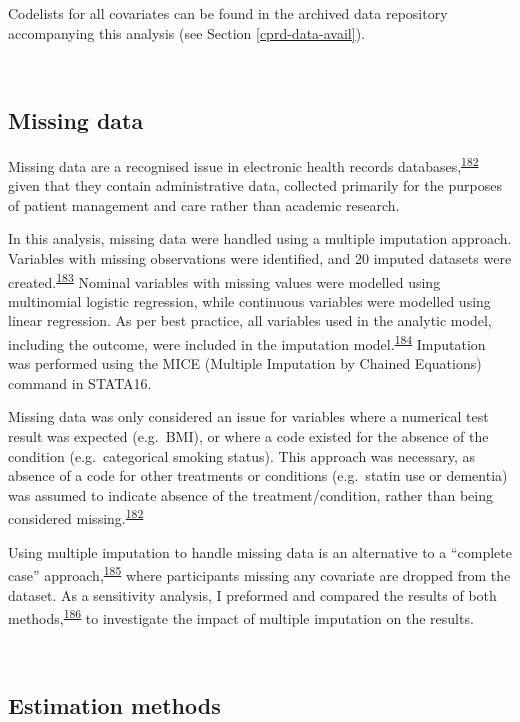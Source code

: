 \documentclass[a4paper, twoside]{templates/ociamthesis}
\begin{document}
Codelists for all covariates can be found in the archived data repository accompanying this analysis (see Section \ref{cprd-data-avail}).

~

\hypertarget{missing-data}{%
\subsection{Missing data}\label{missing-data}}

Missing data are a recognised issue in electronic health records databases,\textsuperscript{\protect\hyperlink{ref-wells2013strategies}{182}} given that they contain administrative data, collected primarily for the purposes of patient management and care rather than academic research.

In this analysis, missing data were handled using a multiple imputation approach. Variables with missing observations were identified, and 20 imputed datasets were created.\textsuperscript{\protect\hyperlink{ref-sterne2009}{183}} Nominal variables with missing values were modelled using multinomial logistic regression, while continuous variables were modelled using linear regression. As per best practice, all variables used in the analytic model, including the outcome, were included in the imputation model.\textsuperscript{\protect\hyperlink{ref-moons2006using}{184}} Imputation was performed using the MICE (Multiple Imputation by Chained Equations) command in STATA16.

Missing data was only considered an issue for variables where a numerical test result was expected (e.g.~BMI), or where a code existed for the absence of the condition (e.g.~categorical smoking status). This approach was necessary, as absence of a code for other treatments or conditions (e.g.~statin use or dementia) was assumed to indicate absence of the treatment/condition, rather than being considered missing.\textsuperscript{\protect\hyperlink{ref-wells2013strategies}{182}}

Using multiple imputation to handle missing data is an alternative to a ``complete case'' approach,\textsuperscript{\protect\hyperlink{ref-pigott2001review}{185}} where participants missing any covariate are dropped from the dataset. As a sensitivity analysis, I preformed and compared the results of both methods,\textsuperscript{\protect\hyperlink{ref-hughes2019}{186}} to investigate the impact of multiple imputation on the results.

~

\hypertarget{estimation-methods}{%
\subsection{Estimation methods}\label{estimation-methods}}
\end{document}

